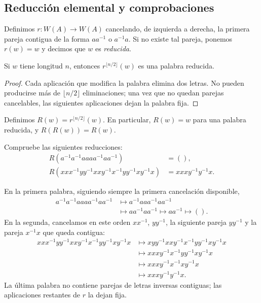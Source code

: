 \subsection{Reducción elemental y comprobaciones}
Definimos $r:W(A)\to W(A)$ cancelando, de izquierda a derecha, la primera pareja contigua de la forma $aa^{-1}$ o $a^{-1}a$. Si no existe tal pareja, ponemos $r(w)=w$ y decimos que $w$ es \emph{reducida}.

\begin{lema}
Si $w$ tiene longitud $n$, entonces $r^{\lfloor n/2\rfloor}(w)$ es una palabra reducida.
\end{lema}
\begin{proof}
Cada aplicación que modifica la palabra elimina dos letras. No pueden producirse más de $\lfloor n/2\rfloor$ eliminaciones; una vez que no quedan parejas cancelables, las siguientes aplicaciones dejan la palabra fija.
\end{proof}
Definimos $R(w)=r^{\lfloor n/2\rfloor}(w)$. En particular, $R(w)=w$ para una palabra reducida, y $R(R(w))=R(w)$.

\begin{ejer}\label{ejer:C3-reducciones}
Compruebe las siguientes reducciones:
\[
\begin{aligned}
R(a^{-1}a^{-1}aaaa^{-1}aa^{-1})&=(),\\
R(xxx^{-1}yy^{-1}xxy^{-1}x^{-1}yy^{-1}xy^{-1}x)
&=xxxy^{-1}y^{-1}x.
\end{aligned}
\]
\end{ejer}
\begin{sol}
En la primera palabra, siguiendo siempre la primera cancelación disponible,
\[
\begin{aligned}
a^{-1}a^{-1}aaaa^{-1}aa^{-1}
&\longmapsto a^{-1}aaa^{-1}aa^{-1}\\
&\longmapsto aa^{-1}aa^{-1}
\longmapsto aa^{-1}\longmapsto().
\end{aligned}
\]
En la segunda, cancelamos en este orden $xx^{-1}$, $yy^{-1}$, la siguiente pareja $yy^{-1}$ y la pareja $x^{-1}x$ que queda contigua:
\[
\begin{aligned}
xxx^{-1}yy^{-1}xxy^{-1}x^{-1}yy^{-1}xy^{-1}x
&\longmapsto xyy^{-1}xxy^{-1}x^{-1}yy^{-1}xy^{-1}x\\
&\longmapsto xxxy^{-1}x^{-1}yy^{-1}xy^{-1}x\\
&\longmapsto xxxy^{-1}x^{-1}xy^{-1}x\\
&\longmapsto xxxy^{-1}y^{-1}x.
\end{aligned}
\]
La última palabra no contiene parejas de letras inversas contiguas; las aplicaciones restantes de $r$ la dejan fija.
\end{sol}

